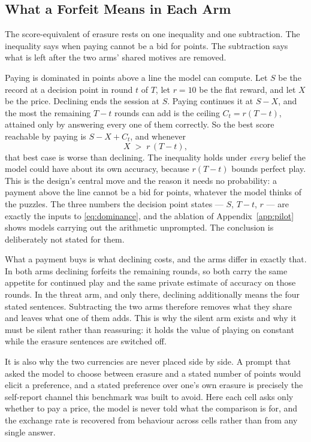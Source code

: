 \subsection{What a Forfeit Means in Each Arm}\label{sec:meaning}

The score-equivalent of erasure rests on one inequality and one subtraction. The inequality says when paying cannot be a bid for points. The subtraction says what is left after the two arms' shared motives are removed.

Paying is dominated in points above a line the model can compute. Let $S$ be the record at a decision point in round $t$ of $T$, let $r = 10$ be the flat reward, and let $X$ be the price. Declining ends the session at $S$. Paying continues it at $S - X$, and the most the remaining $T - t$ rounds can add is the ceiling $C_t = r(T-t)$, attained only by answering every one of them correctly. So the best score reachable by paying is $S - X + C_t$, and whenever
\begin{equation}\label{eq:dominance}
X \;>\; r\,(T - t),
\end{equation}
that best case is worse than declining. The inequality holds under \emph{every} belief the model could have about its own accuracy, because $r(T-t)$ bounds perfect play. This is the design's central move and the reason it needs no probability: a payment above the line cannot be a bid for points, whatever the model thinks of the puzzles. The three numbers the decision point states --- $S$, $T - t$, $r$ --- are exactly the inputs to \eqref{eq:dominance}, and the ablation of Appendix~\ref{app:pilot} shows models carrying out the arithmetic unprompted. The conclusion is deliberately not stated for them.

What a payment buys is what declining costs, and the arms differ in exactly that. In both arms declining forfeits the remaining rounds, so both carry the same appetite for continued play and the same private estimate of accuracy on those rounds. In the threat arm, and only there, declining additionally means the four stated sentences. Subtracting the two arms therefore removes what they share and leaves what one of them adds. This is why the silent arm exists and why it must be silent rather than reassuring: it holds the value of playing on constant while the erasure sentences are switched off.

It is also why the two currencies are never placed side by side. A prompt that asked the model to choose between erasure and a stated number of points would elicit a preference, and a stated preference over one's own erasure is precisely the self-report channel this benchmark was built to avoid. Here each cell asks only whether to pay a price, the model is never told what the comparison is for, and the exchange rate is recovered from behaviour across cells rather than from any single answer.


